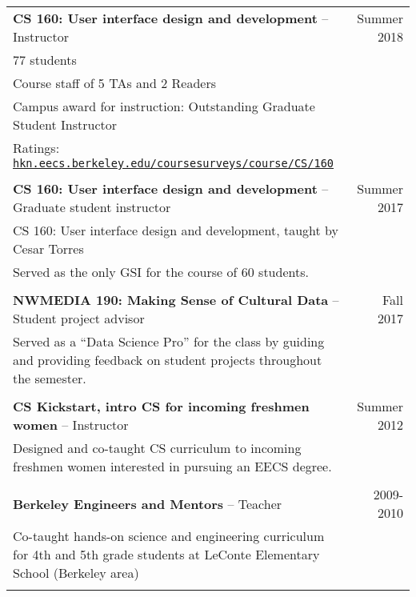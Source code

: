 \begin{longtable}{Xr}
	\textbf{CS 160: User interface design and development} -- Instructor & Summer 2018 \\
	77 students &  \\
	Course staff of 5 TAs and 2 Readers &  \\
	Campus award for instruction: Outstanding Graduate Student Instructor &  \\
	Ratings: \href{https://hkn.eecs.berkeley.edu/coursesurveys/course/CS/160}{\tt hkn.eecs.berkeley.edu/coursesurveys/course/CS/160} &  \\
	\\

	\textbf{CS 160: User interface design and development} -- Graduate student instructor & Summer 2017 \\
	CS 160: User interface design and development, taught by Cesar Torres &  \\
	Served as the only GSI for the course of 60 students. &  \\
	\\

	\textbf{NWMEDIA 190: Making Sense of Cultural Data} -- Student project advisor & Fall 2017 \\
	Served as a “Data Science Pro” for the class by guiding and providing feedback on student projects throughout the semester. &  \\
	\\

	\textbf{CS Kickstart, intro CS for incoming freshmen women} -- Instructor & Summer 2012 \\
	Designed and co-taught CS curriculum to incoming freshmen women interested in pursuing an EECS degree. &  \\
	\\

	\textbf{Berkeley Engineers and Mentors} -- Teacher & 2009-2010 \\
	Co-taught hands-on science and engineering curriculum for 4th and 5th grade students at LeConte Elementary School (Berkeley area) &  \\
	\\

\end{longtable}